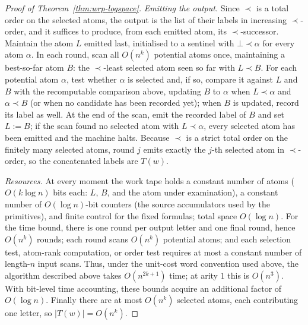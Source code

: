 \documentclass[11pt]{article}
\theoremstyle{definition}
\begin{document}
\begin{proof}[Proof of Theorem~\ref{thm:wrp-logspace}]
\vspace{0.5em}
\noindent\emph{Emitting the output.}
Since $\prec$ is a total order on the selected atoms, the output is the list
of their labels in increasing $\prec$-order, and it suffices to produce, from
each emitted atom, its $\prec$-successor.  Maintain the atom $L$ emitted last,
initialised to a sentinel with $\bot\prec\alpha$ for every atom $\alpha$.  In
each round, scan all $O(n^k)$ potential atoms once, maintaining a best-so-far
atom $B$: the $\prec$-least selected atom seen so far with $L\prec B$.  For
each potential atom $\alpha$, test whether $\alpha$ is selected and, if so,
compare it against $L$ and $B$ with the recomputable comparison above,
updating $B$ to $\alpha$ when $L\prec\alpha$ and $\alpha\prec B$ (or when no
candidate has been recorded yet); when $B$ is updated, record its label as
well.  At the end of the scan, emit the recorded label of $B$ and set $L:=B$;
if the scan found no selected atom with $L\prec\alpha$, every selected atom
has been emitted and the machine halts.  Because $\prec$ is a strict total
order on the finitely many selected atoms, round $j$ emits exactly the
$j$-th selected atom in $\prec$-order, so the concatenated labels are $T(w)$.

\vspace{0.5em}
\noindent\emph{Resources.}
At every moment the work tape holds a constant number of atoms ($O(k\log n)$
bits each: $L$, $B$, and the atom under examination), a constant number of
$O(\log n)$-bit counters (the source accumulators used by the primitives), and
finite control for the fixed formulas; total space $O(\log n)$.  For the time
bound, there is one round per output letter and one final round, hence
$O(n^k)$ rounds; each round scans $O(n^k)$ potential atoms; and each selection
test, atom-rank computation, or order test requires at most a constant number
of length-$n$ input scans.  Thus, under the unit-cost word convention used
above, the algorithm described above takes $O(n^{2k+1})$ time; at arity $1$
this is $O(n^3)$.  With bit-level time accounting, these bounds acquire an
additional factor of $O(\log n)$.  Finally there are at most $O(n^k)$ selected
atoms, each contributing one letter, so $|T(w)|=O(n^k)$.
\end{proof}
\end{document}

